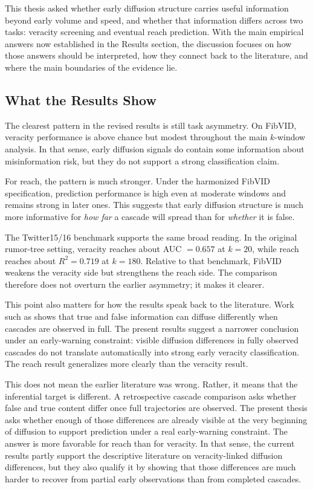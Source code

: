 This thesis asked whether early diffusion structure carries useful information beyond early volume and speed, and whether that information differs across two tasks: veracity screening and eventual reach prediction. With the main empirical answers now established in the Results section, the discussion focuses on how those answers should be interpreted, how they connect back to the literature, and where the main boundaries of the evidence lie.

\subsection{What the Results Show}
The clearest pattern in the revised results is still task asymmetry. On FibVID, veracity performance is above chance but modest throughout the main $k$-window analysis. In that sense, early diffusion signals do contain some information about misinformation risk, but they do not support a strong classification claim.

For reach, the pattern is much stronger. Under the harmonized FibVID specification, prediction performance is high even at moderate windows and remains strong in later ones. This suggests that early diffusion structure is much more informative for \emph{how far} a cascade will spread than for \emph{whether} it is false.

The Twitter15/16 benchmark supports the same broad reading. In the original rumor-tree setting, veracity reaches about AUC $=0.657$ at $k=20$, while reach reaches about $R^2=0.719$ at $k=180$. Relative to that benchmark, FibVID weakens the veracity side but strengthens the reach side. The comparison therefore does not overturn the earlier asymmetry; it makes it clearer.

This point also matters for how the results speak back to the literature. Work such as \citet{vosoughi_spread_2018} shows that true and false information can diffuse differently when cascades are observed in full. The present results suggest a narrower conclusion under an early-warning constraint: visible diffusion differences in fully observed cascades do not translate automatically into strong early veracity classification. The reach result generalizes more clearly than the veracity result.

This does not mean the earlier literature was wrong. Rather, it means that the inferential target is different. A retrospective cascade comparison asks whether false and true content differ once full trajectories are observed. The present thesis asks whether enough of those differences are already visible at the very beginning of diffusion to support prediction under a real early-warning constraint. The answer is more favorable for reach than for veracity. In that sense, the current results partly support the descriptive literature on veracity-linked diffusion differences, but they also qualify it by showing that those differences are much harder to recover from partial early observations than from completed cascades.

